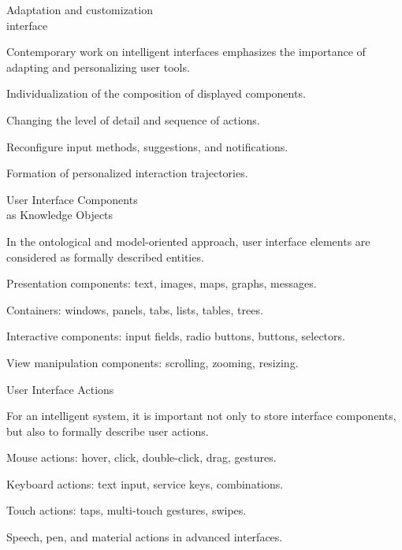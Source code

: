 \begin{frame}{Adaptation and customization\\interface}
	\topline
	\justifying
	
	Contemporary work on intelligent interfaces emphasizes the importance of adapting and personalizing user tools.
	
	\begin{textitemize}
		\item Individualization of the composition of displayed components.
		\item Changing the level of detail and sequence of actions.
		\item Reconfigure input methods, suggestions, and notifications.
		\item Formation of personalized interaction trajectories.
	\end{textitemize}
\end{frame}

\begin{frame}{User Interface Components\\ as Knowledge Objects}
	\topline
	\justifying
	
	In the ontological and model-oriented approach, user interface elements are considered as formally described entities.
	
	\begin{textitemize}
		\item Presentation components: text, images, maps, graphs, messages.
		\item Containers: windows, panels, tabs, lists, tables, trees.
		\item Interactive components: input fields, radio buttons, buttons, selectors.
		\item View manipulation components: scrolling, zooming, resizing.
	\end{textitemize}
\end{frame}

\begin{frame}{User Interface Actions}
	\topline
	\justifying
	
	For an intelligent system, it is important not only to store interface components, but also to formally describe user actions.
	
	\begin{textitemize}
		\item Mouse actions: hover, click, double-click, drag, gestures.
		\item Keyboard actions: text input, service keys, combinations.
		\item Touch actions: taps, multi-touch gestures, swipes.
		\item Speech, pen, and material actions in advanced interfaces.
	\end{textitemize}
\end{frame}

